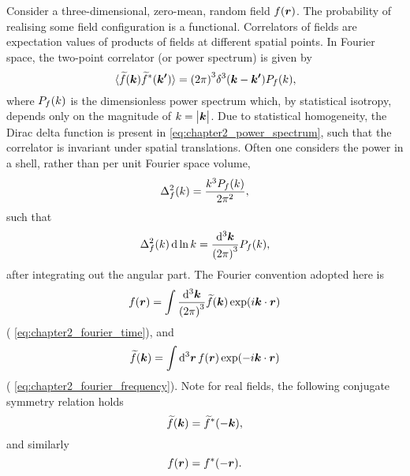 Consider a three-dimensional, zero-mean, random field \(f(\vb*{r})\).
The probability of realising some field configuration is a functional.
Correlators of fields are expectation values of products of fields at different spatial points.
In Fourier space, the two-point correlator (or power spectrum) is given by
%
\begin{equation}\label{eq:chapter2_power_spectrum}
	\expval*{\widetilde{f}(\vb*{k}) \widetilde{f}^{\ast}(\vb*{k'})}
	= {(2\pi)}^{3} \delta^{3}(\vb*{k} - \vb*{k'}) P_{f}(k),
\end{equation}
%
where \(P_{f}(k)\) is the dimensionless power spectrum which, by statistical isotropy, depends only on the magnitude of \(k=\big\lvert\vb*{k}\big\rvert\).
Due to statistical homogeneity, the Dirac delta function is present in \cref{eq:chapter2_power_spectrum}, such that the correlator is invariant under spatial translations.
Often one considers the power in a shell, rather than per unit Fourier space volume, \ie{}
%
\begin{equation}\label{eq:chapter2_power_shell}
	\Delta_{f}^{2}(k)
	= \frac{k^{3}P_{f}(k)}{2\pi^{2}},
\end{equation}
%
such that
%
\begin{equation}
	\Delta_{f}^{2}(k) \dd{\ln{k}}
	= \frac{\dd[3]{\vb*{k}}}{{(2\pi)}^{3}} P_{f}(k),
\end{equation}
%
after integrating out the angular part.
The Fourier convention adopted here is
%
\begin{equation}
	f(\vb*{r})
	= \int\frac{\dd[3]{\vb*{k}}}{{(2\pi)}^{3}} \widetilde{f}(\vb*{k}) \exp(i\vb*{k}\cdot\vb*{r})
\end{equation}
%
(\cf{} \cref{eq:chapter2_fourier_time}), and
%
\begin{equation}
	\widetilde{f}(\vb*{k})
	= \int\dd[3]{\vb*{r}} f(\vb*{r}) \exp(-i\vb*{k}\cdot\vb*{r})
\end{equation}
%
(\cf{} \cref{eq:chapter2_fourier_frequency}).
Note for real fields, the following conjugate symmetry relation holds
%
\begin{equation}
	\widetilde{f}(\vb*{k})
	= \widetilde{f}^{\ast}(-\vb*{k}),
\end{equation}
%
and similarly
%
\begin{equation}
	f(\vb*{r})
	= f^{\ast}(-\vb*{r}).
\end{equation}

